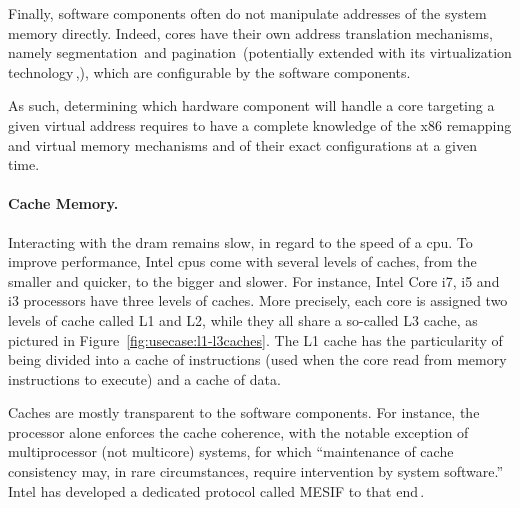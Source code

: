 Finally, software components often do not manipulate addresses of the system
memory directly.
%
Indeed, cores have their own address translation mechanisms, namely
segmentation\,\cite[Volume 3, Section 2.4]{intel2014manual} and
pagination\,\cite[Volume 3, Chapter 4]{intel2014manual} (potentially extended
with its virtualization technology\,\cite[Volume 3, Section
28.2]{intel2014manual},), which are configurable by the software components.

As such, determining which hardware component will handle a core \IO targeting a
given virtual address requires to have a complete knowledge of the x86 remapping
and virtual memory mechanisms and of their exact configurations at a given time.

\paragraph{Cache Memory.}
%
Interacting with the \ac{dram} remains slow, in regard to the speed of a
\ac{cpu}.
%
To improve performance, Intel \acp{cpu} come with several levels of caches, from
the smaller and quicker, to the bigger and slower.
%
For instance, Intel Core i7, i5 and i3 processors have three levels of caches.
%
More precisely, each core is assigned two levels of cache called L1 and L2,
while they all share a so-called L3 cache, as pictured in
Figure~\ref{fig:usecase:l1-l3caches}.
%
%
The L1 cache has the particularity of being divided into a cache of instructions
(used when the core read from memory instructions to execute) and a cache of
data.

Caches are mostly transparent to the software components.
%
For instance, the processor alone enforces the cache coherence, with the notable
exception of multiprocessor (not multicore) systems, for which ``maintenance of
cache consistency may, in rare circumstances, require intervention by system
software.''
%
Intel has developed a dedicated protocol called MESIF to that
end\,\cite{thomadakis2011nehalem}.

